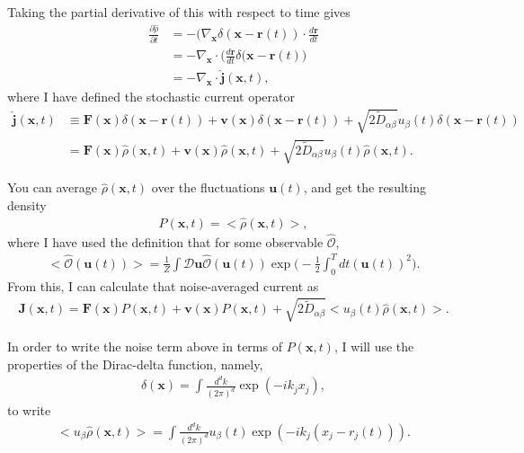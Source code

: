 \documentclass{article}
\begin{document}
Taking the partial derivative of this with respect to time gives
\begin{align}
  \frac{\partial\hat{\rho}}{\partial t}&=-(\nabla_{\bm{x}}\delta(\bm{x}-\bm{r}(t))
                                         \cdot\frac{d\bm{r}}{dt}\nonumber\\
                                       &=-\nabla_{\bm{x}}\cdot\bigg(\frac{d\bm{r}}{dt}
                                         \delta(\bm{x}-\bm{r}(t)\bigg)\nonumber\\
                                       &=-\nabla_{\bm{x}}\cdot\hat{\bm{j}}(\bm{x},t),
\end{align}
where I have defined the stochastic current operator
\begin{align}
  \hat{\bm{j}}(\bm{x},t)&\equiv\bm{F}(\bm{x})\delta(\bm{x}-\bm{r}(t))
                          +\bm{v}(\bm{x})\delta(\bm{x}-\bm{r}(t))
                          +\sqrt{2\tilde{D}_{\alpha\beta}}u_{\beta}(t)
                          \delta(\bm{x}-\bm{r}(t))\nonumber\\
                        &=\bm{F}(\bm{x})\hat{\rho}(\bm{x},t)
                          +\bm{v}(\bm{x})\hat{\rho}(\bm{x},t)
                          +\sqrt{2\tilde{D}_{\alpha\beta}}u_{\beta}(t)\hat{\rho}(\bm{x},t).
\end{align}

You can average $\hat{\rho}(\bm{x},t)$ over the fluctuations $\bm{u}(t)$, and get the
resulting density
\begin{align}
  P(\bm{x},t)=<\hat{\rho}(\bm{x},t)>,
\end{align}
where I have used the definition that for some observable $\hat{\mathcal{O}}$,
\begin{align}
  <\hat{\mathcal{O}}(\bm{u}(t))>=\frac{1}{Z}\int\mathcal{D}\bm{u}
  \hat{\mathcal{O}}(\bm{u}(t))\exp\bigg(-\frac{1}{2}\int_0^Tdt(\bm{u}(t))^2\bigg).
\end{align}
From this, I can calculate that noise-averaged current as
\begin{align}
  \bm{J}(\bm{x},t)=\bm{F}(\bm{x})P(\bm{x},t)+\bm{v}(\bm{x})P(\bm{x},t)
  +\sqrt{2\tilde{D}_{\alpha\beta}}<u_{\beta}(t)\hat{\rho}(\bm{x},t)>.
\end{align}

In order to write the noise term above in terms of $P(\bm{x},t)$, I will use the properties
of the Dirac-delta function, namely,
\begin{align}
  \delta(\bm{x})=\int\frac{d^dk}{(2\pi)^d}\exp(-ik_jx_j),
\end{align}
to write
\begin{align}
  <u_{\beta}\hat{\rho}(\bm{x},t)>=\int\frac{d^dk}{(2\pi)^d}u_{\beta}(t)
  \exp(-ik_j(x_j-r_j(t))).
\end{align}
\end{document}
